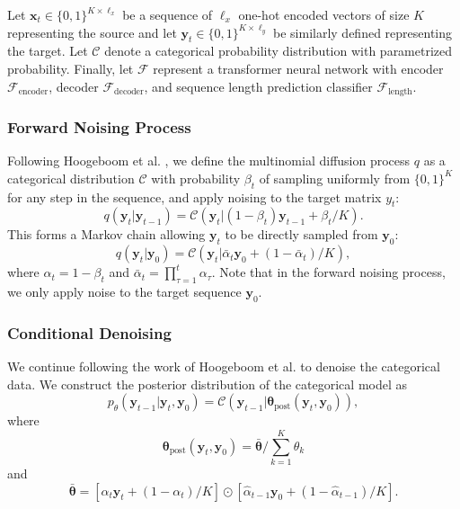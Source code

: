 \documentclass{article}
\begin{document}
Let $\bm{x}_t \in \{0,1\}^{K \times \ell_x}$ be a sequence of $\ell_x$ one-hot encoded vectors of size $K$ representing the source and let $\bm{y}_t \in \{0,1\}^{K \times \ell_y}$ be similarly defined representing the target. Let $\mathcal{C}$ denote a categorical probability distribution with parametrized probability. Finally, let $\mathcal{F}$ represent a transformer neural network with encoder $\mathcal{F}_{\text{encoder}}$, decoder $\mathcal{F}_{\text{decoder}}$, and sequence length prediction classifier $\mathcal{F}_{\text{length}}$.

\subsubsection{Forward Noising Process}
Following Hoogeboom et al. \cite{hoogeboom2021argmax}, we define the multinomial diffusion process $q$ as a categorical distribution $\mathcal{C}$ with probability $\beta_t$ of sampling uniformly from $\{0, 1\}^K$ for any step in the sequence, and apply noising to the target matrix $y_t$:
\begin{equation}
    q(\bm{y}_t | \bm{y}_{t-1}) = \mathcal{C}(\bm{y}_t | (1-\beta_t)\bm{y}_{t-1} + \beta_t / K).
\end{equation}
This forms a Markov chain allowing $\bm{y}_t$ to be directly sampled from $\bm{y}_0$:
\begin{equation}
    q(\bm{y}_t | \bm{y}_0) = \mathcal{C}(\bm{y}_t | \bar{\alpha}_t\bm{y}_0 + (1 - \bar{\alpha}_t)/K),
\end{equation}
where $\alpha_t = 1 - \beta_t$ and $\bar{\alpha}_t = \prod_{\tau=1}^t\alpha_\tau$. Note that in the forward noising process, we only apply noise to the target sequence $\bm{y}_0$.

\subsubsection{Conditional Denoising}
We continue following the work of Hoogeboom et al. to denoise the categorical data. We construct the posterior distribution of the categorical model as
\begin{equation}
    p_{\theta}(\bm{y}_{t-1} | \bm{y}_t, \bm{y}_0) = \mathcal{C}(\bm{y}_{t-1} | \bm{\theta}_{\text{post}}(\bm{y}_t, \bm{y}_0)),
\end{equation}
where 
\begin{equation}
    \bm{\theta}_{\text{post}}(\bm{y}_t, \bm{y}_0) = \bar{\bm{\theta}}/\sum_{k=1}^K\hat{\theta}_k
\end{equation}
and
\begin{equation}
    \bar{\bm{\theta}} = [\alpha_t \bm{y}_t + (1 - \alpha_t)/K] \odot [\hat{\alpha}_{t-1} \bm{y}_0 + (1 - \hat{\alpha}_{t-1})/K].
\end{equation}
\end{document}
